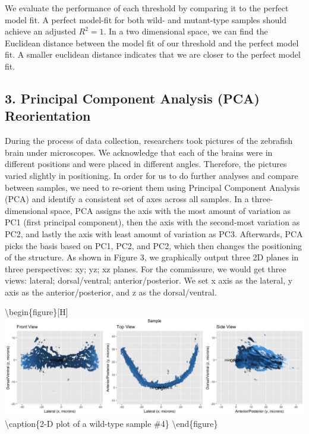 \documentclass[10pt,letterpaper]{article}
\begin{document}
We evaluate the performance of each threshold by comparing it to the
perfect model fit. A perfect model-fit for both wild- and mutant-type
samples should achieve an adjusted \(R^2 = 1\). In a two dimensional
space, we can find the Euclidean distance between the model fit of our
threshold and the perfect model fit. A smaller euclidean distance
indicates that we are closer to the perfect model fit.

\hypertarget{principal-component-analysis-pca-reorientation}{%
\subsection{3. Principal Component Analysis (PCA)
Reorientation}\label{principal-component-analysis-pca-reorientation}}

During the process of data collection, researchers took pictures of the
zebrafish brain under microscopes. We acknowledge that each of the
brains were in different positions and were placed in different angles.
Therefore, the pictures varied slightly in positioning. In order for us
to do further analyses and compare between samples, we need to re-orient
them using Principal Component Analysis (PCA) and identify a consistent
set of axes across all samples. In a three-dimensional space, PCA
assigns the axis with the most amount of variation as PC1 (first
principal component), then the axis with the second-most variation as
PC2, and lastly the axis with least amount of variation as PC3.
Afterwards, PCA picks the basis based on PC1, PC2, and PC2, which then
changes the positioning of the structure. As shown in Figure 3, we
graphically output three 2D planes in three perspectives: xy; yz; xz
planes. For the commissure, we would get three views: lateral;
dorsal/ventral; anterior/posterior. We set x axis as the lateral, y axis
as the anterior/posterior, and z as the dorsal/ventral.

\textbackslash{}begin\{figure\}{[}H{]}
\includegraphics[width=0.9\linewidth]{visualization_paper/wt_04}
\textbackslash{}caption\{2-D plot of a wild-type sample
\#4\}\label{fig:Figure3} \textbackslash{}end\{figure\}
\end{document}
